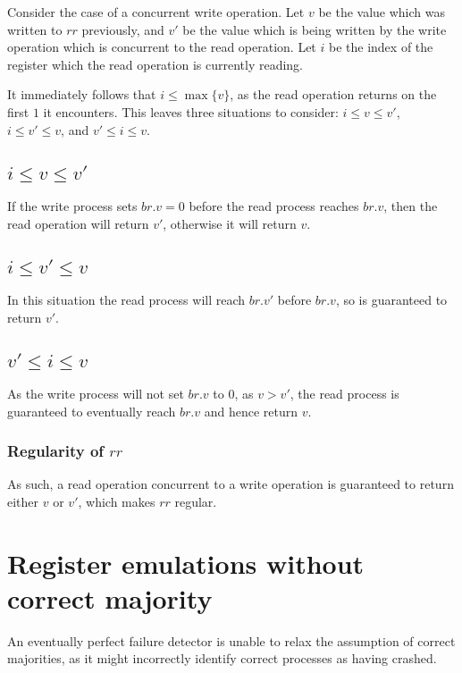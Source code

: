 \documentclass[a4paper]{scrreprt}
\begin{document}
Consider the case of a concurrent write operation. Let $v$ be the value which
was written to $rr$ previously, and $v'$ be the value which is being written by
the write operation which is concurrent to the read operation. Let $i$ be the
index of the register which the read operation is currently reading.

It immediately follows that $i \leq \max\{v\}$, as the read operation
returns on the first $1$ it encounters. This leaves three situations to
consider: $i \leq v \leq v'$, $i \leq v' \leq v$, and $v' \leq i \leq v$.

\subsection{$i \leq v \leq v'$}

If the write process sets $br.v = 0$ before the read process reaches $br.v$,
then the read operation will return $v'$, otherwise it will return $v$.

\subsection{$i \leq v' \leq v$}

In this situation the read process will reach $br.v'$ before $br.v$, so is
guaranteed to return $v'$.

\subsection{$v' \leq i \leq v$}

As the write process will not set $br.v$ to $0$, as $v > v'$, the read process
is guaranteed to eventually reach $br.v$ and hence return $v$.

\subsubsection{Regularity of $rr$}

As such, a read operation concurrent to a write operation is guaranteed to
return either $v$ or $v'$, which makes $rr$ regular.


\section{Register emulations without correct majority}

An eventually perfect failure detector is unable to relax the assumption of
correct majorities, as it might incorrectly identify correct processes as
having crashed.
\end{document}
